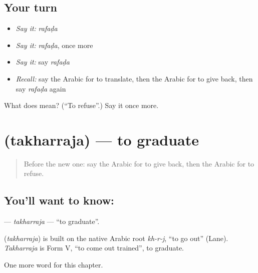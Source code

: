 \subsection*{Your turn}
\begin{itemize}
\raggedright
  \item \emph{Say it:} \emph{rafaḍa}
  \item \emph{Say it:} \emph{rafaḍa}, once more
  \item \emph{Say it:} say \emph{rafaḍa}
  \item \emph{Recall:} say the Arabic for to translate, then the Arabic for to give back, then say \emph{rafaḍa} again
\end{itemize}

\begin{tcolorbox}[breakable,colback=teal!4,colframe=teal!35!black,title={Before you move on}]
What does  mean? (\textquotedblleft{}To refuse\textquotedblright{}.) Say it once more.
\end{tcolorbox}
\section[\texorpdfstring{\ar{تخرج} (takharraja)}{تخرج (takharraja)}]{ (takharraja) — to graduate}

\label{lesson:AR-C257-takharraja}



\begin{quote}
Before the new one: say the Arabic for to give back, then the Arabic for to refuse.
\end{quote}

\subsection*{You'll want to know: }
\textbf{} — \emph{takharraja} — \textquotedblleft{}to graduate\textquotedblright{}.

\begin{cousinweb}
\textbf{} (\emph{takharraja}) is built on the native Arabic root \emph{kh-r-j}, \textquotedblleft{}to go out\textquotedblright{} (Lane). \emph{Takharraja} is Form V, \textquotedblleft{}to come out trained\textquotedblright{}, to graduate.
\end{cousinweb}

\begin{grammarlens}[title={What you've built}]
One more word for this chapter.
\end{grammarlens}

